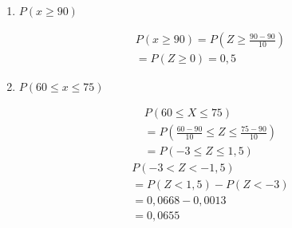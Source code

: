 \begin{example}
\begin{enumerate}[label=(\alph*)]
        \item $P(x \geq  90)$
          \begin{figure}[H]
            \centering
            
            \label{fig:}
          \end{figure}
          \begin{align*}
            P(x \geq 90) =P(Z \geq \frac{90-90}{10}) \\
            = P(Z \geq 0)=0,5
          \end{align*}

        \item $P(60 \leq x \leq 75 )$
          \begin{figure}[H]
            \centering
            
            \label{fig:}
          \end{figure}
          \begin{figure}[H]
            \centering
            
            \label{fig:}
          \end{figure}


          \begin{align*}
            P(60 \leq X \leq 75 ) \\
            =P(\frac{60-90}{10} \leq Z \leq \frac{75-90}{10}) \\
            =P(-3 \leq Z \leq 1,5)
          \end{align*}
          \begin{align*}
            P(-3 < Z < -1,5)\\
            =P(Z <1,5)- P(Z< -3) \\
            =0,0668- 0,0013 \\
            =0,0655
          \end{align*}

      \end{enumerate}
    \end{example}  
